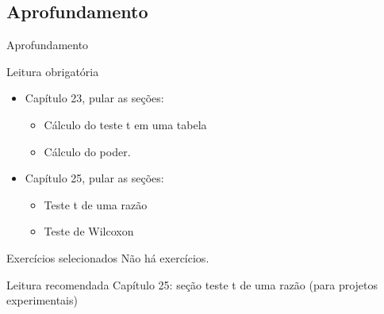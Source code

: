 \documentclass{beamer}
\begin{document}
\subsection{Aprofundamento}

\begin{frame}{Aprofundamento}
  \begin{block}{Leitura obrigatória}
    \begin{itemize}
      \small
    \item Capítulo 23, pular as seções:
      \begin{itemize}
        \scriptsize
      \item Cálculo do teste t em uma tabela
      \item Cálculo do poder.
      \end{itemize}
    \item Capítulo 25, pular as seções:
      \begin{itemize}
        \scriptsize
      \item Teste t de uma razão
      \item Teste de Wilcoxon
      \end{itemize}
    \end{itemize}
  \end{block}
  \begin{block}{Exercícios selecionados}
    \footnotesize
    Não há exercícios.
  \end{block}
  \begin{block}{Leitura recomendada}
    \footnotesize
    Capítulo 25: seção teste t de uma razão (para projetos experimentais)
  \end{block}
\end{frame}
\end{document}
